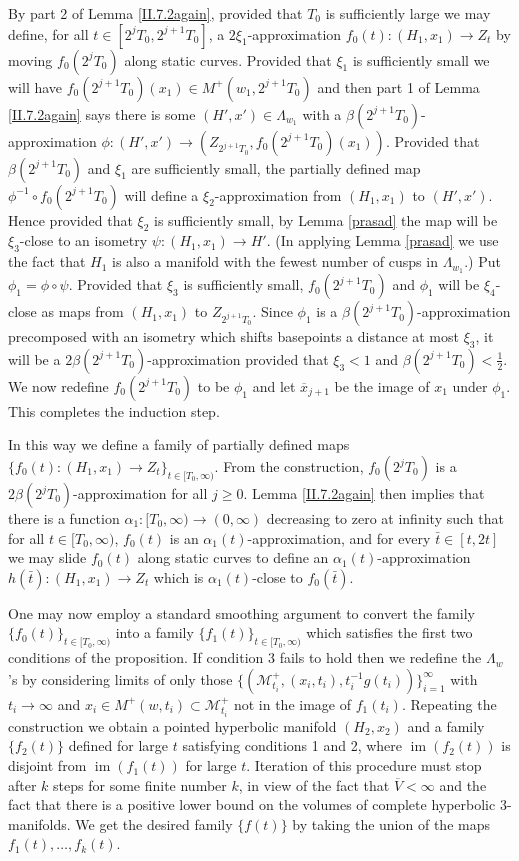 \documentclass[12pt]{amsart}
\newcommand{\im}{\operatorname{im}}
\newcommand{\La}{\Lambda}
\newcommand{\M}{{\mathcal M}}
\newcommand{\ra}{\rightarrow}
\numberwithin{equation}{section}
\theoremstyle{plain}
\theoremstyle{definition}
\theoremstyle{remark}
\begin{document}
By part 2 of Lemma \ref{II.7.2again}, provided that $T_0$ is 
sufficiently large we may define, for all $t\in [2^j T_0, 2^{j+1} T_0]$,
a  $2\xi_1$-approximation $f_0(t):(H_1,x_1)\ra Z_t$ by 
moving $f_0(2^j T_0)$ along static curves.  Provided that
$\xi_1$ is sufficiently small we will have 
$f_0(2^{j+1} T_0)(x_1)\in M^+(w_1,2^{j+1} T_0)$ and then part 1 of 
Lemma \ref{II.7.2again} says there is some $(H',x')\in \La_{w_1}$
with a $\beta(2^{j+1} T_0)$-approximation 
$\phi:(H',x')\ra (Z_{2^{j+1} T_0},f_0(2^{j+1} T_0)(x_1))$.  
Provided that 
$\beta(2^{j+1} T_0)$
and $\xi_1$ are sufficiently small, the partially defined map
$\phi^{-1}\circ f_0(2^{j+1} T_0)$ will define a $\xi_2$-approximation
from $(H_1,x_1)$ to $(H',x')$. Hence provided that $\xi_2$
is sufficiently small, by Lemma \ref{prasad}
the map will be $\xi_3$-close to an isometry 
$\psi:(H_1,x_1)\ra H'$. 
(In applying Lemma \ref{prasad} we use the fact that $H_1$ is
also a manifold with the fewest number of cusps in $\Lambda_{w_1}$.)
 Put $\phi_1= \phi\circ\psi$.
Provided that $\xi_3$ is sufficiently small, 
$f_0(2^{j+1} T_0)$ and $\phi_1$ will be $\xi_4$-close as maps from 
$(H_1,x_1)$ to $Z_{2^{j+1} T_0}$.  
Since $\phi_1$ is a $\beta(2^{j+1} T_0)$-approximation
precomposed with an isometry which shifts basepoints a 
distance at most $\xi_3$, it will be a $2\beta(2^{j+1} T_0)$-approximation
provided that $\xi_3<1$ and $\beta(2^{j+1} T_0)<\frac12$.  We now redefine 
$f_0(2^{j+1} T_0)$ to be $\phi_1$ and let $\overline{x}_{j+1}$ be the
image of $x_1$ under $\phi_1$. This completes the induction step.

In this way we define a family of partially defined maps
$\{f_0(t):(H_1,x_1)\ra Z_t\}_{t\in [T_0,\infty)}$.  
From the construction,
$f_0(2^jT_0)$ is a $2\beta(2^jT_0)$-approximation
for all $j\geq 0$.   Lemma \ref{II.7.2again} then implies
that there is a  function 
$\alpha_1:[T_0,\infty)\ra(0,\infty)$ decreasing to 
zero at infinity such that for all $t\in[T_0,\infty)$,
$f_0(t)$ is an $\alpha_1(t)$-approximation, and for every
$\bar t\in [t,2t]$ we may slide 
$f_0(t)$
along
static curves to define an $\alpha_1(t)$-approximation
 $h(\bar t):(H_1,x_1)\ra Z_t$ which is $\alpha_1(t)$-close
to 
$f_0(\bar t)$. 

One may now employ a standard smoothing argument to convert the
family $\{f_0(t)\}_{t\in[T_0,\infty)}$ into  a family 
$\{f_1(t)\}_{t\in [T_0,\infty)}$ which satisfies the first two 
conditions of the proposition.   If condition 3 fails to hold then
we redefine the $\La_{w}$'s by considering  limits of only those
$\{(\M^+_{t_i}, (x_i, t_i), t_i^{-1} g(t_i))\}_{i=1}^\infty$
with $t_i \rightarrow \infty$ and 
$x_i \in M^+(w,t_i)\subset \M_{t_i}^+$
not in
the image of $f_1(t_i)$.  Repeating the construction we
obtain a pointed hyperbolic manifold $(H_2,x_2)$ and a
family $\{f_2(t)\}$ defined for large $t$ satisfying conditions
1 and 2, where $\im(f_2(t))$ is disjoint from $\im(f_1(t))$ for large
$t$.  Iteration of this procedure must stop after  $k$ 
steps for some finite number $k$, in view of the fact that $\overline{V} < \infty$ and
the fact that there is a positive lower bound on the volumes of
complete hyperbolic $3$-manifolds. We get the
desired family $\{f(t)\}$ by taking the union of the maps
$f_1(t),\ldots,f_k(t)$.    
\end{document}
